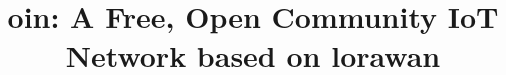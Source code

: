 \documentclass[conference]{IEEEtran}
\begin{document}
\title{\gls{oin}: A Free, Open Community \acrshort{IoT} Network based on \gls{lorawan}}


\author{
\IEEEauthorblockA{}
\and
{}
\IEEEauthorblockA{}
}


\maketitle






%
\IEEEpeerreviewmaketitle

%
%
\end{document}
